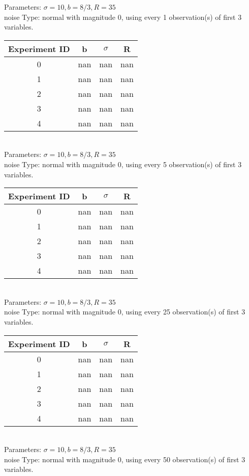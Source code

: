 \begin{multicols}{3}
Parameters: $\sigma=10, b=8/3, R=35$\\
noise Type: normal with magnitude 0, using every 1 observation(s) of first 3 variables.\\
\begin{tabular}{cccc}
\hline Experiment ID & b & $\sigma$ & R \\ \hline 
0 & nan & nan & nan\\ \hline 
 1 & nan & nan & nan\\ \hline 
 2 & nan & nan & nan\\ \hline 
 3 & nan & nan & nan\\ \hline 
 4 & nan & nan & nan\\ \hline 
 \end{tabular}\\
Parameters: $\sigma=10, b=8/3, R=35$\\
noise Type: normal with magnitude 0, using every 5 observation(s) of first 3 variables.\\
\begin{tabular}{cccc}
\hline Experiment ID & b & $\sigma$ & R \\ \hline 
0 & nan & nan & nan\\ \hline 
 1 & nan & nan & nan\\ \hline 
 2 & nan & nan & nan\\ \hline 
 3 & nan & nan & nan\\ \hline 
 4 & nan & nan & nan\\ \hline 
 \end{tabular}\\
Parameters: $\sigma=10, b=8/3, R=35$\\
noise Type: normal with magnitude 0, using every 25 observation(s) of first 3 variables.\\
\begin{tabular}{cccc}
\hline Experiment ID & b & $\sigma$ & R \\ \hline 
0 & nan & nan & nan\\ \hline 
 1 & nan & nan & nan\\ \hline 
 2 & nan & nan & nan\\ \hline 
 3 & nan & nan & nan\\ \hline 
 4 & nan & nan & nan\\ \hline 
 \end{tabular}\\
Parameters: $\sigma=10, b=8/3, R=35$\\
noise Type: normal with magnitude 0, using every 50 observation(s) of first 3 variables.\\

\end{multicols}

